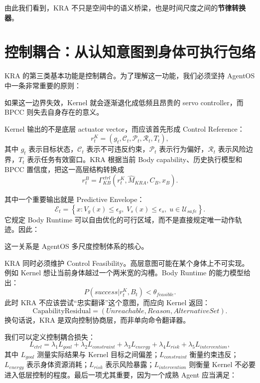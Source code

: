 由此我们看到，KRA 不只是空间中的语义桥梁，也是时间尺度之间的\textbf{节律转换器}。

\section{控制耦合：从认知意图到身体可执行包络}
\label{sec:kra-control-coupling}

KRA 的第三类基本功能是控制耦合。为了理解这一功能，我们必须坚持 AgentOS 中一条非常重要的原则：
\begin{statementbox}
\centering
{}
\end{statementbox}
如果这一边界失效，Kernel 就会逐渐退化成低频且昂贵的 servo controller，而 BPCC 则失去自身存在的意义。

Kernel 输出的不是底层 actuator vector，而应该首先形成 Control Reference：
\[
r_t^K
=
\left(
g_t,
\mathcal C_t,
\mathcal P_t,
\mathcal R_t,
T_t
\right),
\]
其中 $g_t$ 表示目标状态，$\mathcal C_t$ 表示不可违反约束，$\mathcal P_t$ 表示行为偏好，$\mathcal R_t$ 表示风险边界，$T_t$ 表示任务有效窗口。KRA 根据当前 Body capability、历史执行模型和 BPCC 置信度，把这一高层结构转换成
\[
r_t^B
=
\Gamma_{KB}^{ctrl}
\left(
r_t^K,
\hat M_{KRA},
C_B,
x_B
\right).
\]

其中一个重要输出就是 Predictive Envelope：
\[
\mathcal E_t
=
\left\{
x:
V_g(x)\leq\epsilon_g,\;
V_s(x)\leq\epsilon_s,\;
u\in\mathcal U_{safe}
\right\}.
\]
它规定 Body Runtime 可以自由优化的可行区域，而不是直接规定唯一动作轨迹。因此：
\begin{statementbox}
\centering
{}
\end{statementbox}
这一关系是 AgentOS 多尺度控制体系的核心。

KRA 同时必须维护 Control Feasibility。高层意图可能在某个身体上不可实现。例如 Kernel 想让当前身体越过一个两米宽的沟槽。Body Runtime 的能力模型给出：
\[
P(success|r_t^K,B_t)
<\theta_{feasible}.
\]
此时 KRA 不应该尝试``忠实翻译''这个意图，而应向 Kernel 返回：
\[
\mathrm{CapabilityResidual}
=
\left(
Unreachable,
Reason,
AlternativeSet
\right).
\]
换句话说，KRA 是双向控制协商层，而非单向命令翻译器。

我们可以定义控制耦合损失：
\[
L_{ctrl}
=
\lambda_1 L_{goal}
+
\lambda_2 L_{constraint}
+
\lambda_3 L_{energy}
+
\lambda_4 L_{risk}
+
\lambda_5 L_{intervention},
\]
其中 $L_{goal}$ 测量实际结果与 Kernel 目标之间偏差；$L_{constraint}$ 衡量约束违反；$L_{energy}$ 表示身体资源消耗；$L_{risk}$ 表示风险暴露；$L_{intervention}$ 则衡量 Kernel 不必要进入低层控制的程度。最后一项尤其重要，因为一个成熟 Agent 应当满足：
\begin{statementbox}
\centering
{}
\end{statementbox}

